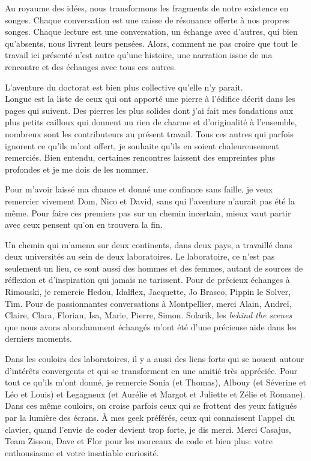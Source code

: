 Au royaume des idées, nous transformons les fragments de notre existence
en songes. Chaque conversation est une caisse de résonance offerte à nos
propres songes. Chaque lecture est une conversation, un échange avec
d'autres, qui bien qu'absents, nous livrent leurs pensées. Alors,
comment ne pas croire que tout le travail ici présenté n'est autre
qu'une histoire, une narration issue de ma rencontre et des échanges
avec tous ces autres.

L'aventure du doctorat est bien plus collective qu'elle n'y parait.\\
Longue est la liste de ceux qui ont apporté une pierre à l'édifice
décrit dans les pages qui suivent. Des pierres les plus solides dont
j'ai fait mes fondations aux plus petits cailloux qui donnent un rien de
charme et d'originalité à l'ensemble, nombreux sont les contributeurs au
présent travail. Tous ces autres qui parfois ignorent ce qu'ils m'ont
offert, je souhaite qu'ils en soient chaleureusement remerciés. Bien
entendu, certaines rencontres laissent des empreintes plus profondes et
je me dois de les nommer.

Pour m'avoir laissé ma chance et donné une confiance sans faille, je
veux remercier vivement Dom, Nico et David, sans qui l'aventure n'aurait
pas été la même. Pour faire ces premiers pas sur un chemin incertain,
mieux vaut partir avec ceux pensent qu'on en trouvera la fin.

Un chemin qui m'amena sur deux continents, dans deux pays, a travaillé
dans deux universités au sein de deux laboratoires. Le laboratoire, ce
n'est pas seulement un lieu, ce sont aussi des hommes et des femmes,
autant de sources de réflexion et d'inspiration qui jamais ne tarissent.
Pour de précieux échanges à Rimouski, je remercie Hedou, Idalflex,
Jacquette, Jo Brasco, Pippin le Solver, Tim. Pour de passionnantes
conversations à Montpellier, merci Alain, Andreï, Claire, Clara,
Florian, Isa, Marie, Pierre, Simon. Solarik, les \emph{behind the
scenes} que nous avons abondamment échangés m'ont été d'une précieuse
aide dans les derniers moments.

Dans les couloirs des laboratoires, il y a aussi des liens forts qui se
nouent autour d'intérêts convergents et qui se transforment en une
amitié très appréciée. Pour tout ce qu'ils m'ont donné, je remercie
Sonia (et Thomas), Albouy (et Séverine et Léo et Louis) et Legagneux (et
Aurélie et Margot et Juliette et Zélie et Romane). Dans ces même
couloirs, on croise parfois ceux qui se frottent des yeux fatigués par
la lumière des écrans. À mes geek préférés, ceux qui connaissent l'appel
du clavier, quand l'envie de coder devient trop forte, je dis merci.
Merci Casajus, Team Zissou, Dave et Flor pour les morceaux de code et
bien plus: votre enthousiasme et votre insatiable curiosité.


